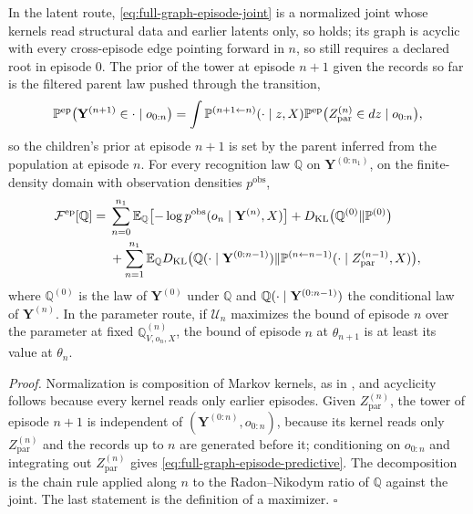 In the latent route, \eqref{eq:full-graph-episode-joint} is a normalized joint whose
kernels read structural data and earlier latents only, so
 holds; its graph is acyclic with every
cross-episode edge pointing forward in $n$, so
 still requires a declared root in episode
$0$. The prior of the tower at episode $n+1$ given the records so far is the filtered
parent law pushed through the transition,
\begin{equation}
\mathbb P^{\mathrm{ep}}\bigl(\mathbf Y^{(n+1)}\in\cdot\mid o_{0:n}\bigr)
=\int\mathbb P^{(n+1\leftarrow n)}(\cdot\mid z,X)
\mathbb P^{\mathrm{ep}}\bigl(Z^{(n)}_{\mathrm{par}}\in dz\mid o_{0:n}\bigr),
\label{eq:full-graph-episode-predictive}
\end{equation}
so the children's prior at episode $n+1$ is set by the parent inferred from the
population at episode $n$. For every recognition law $\mathbb Q$ on $\mathbf
Y^{(0:n_1)}$, on the finite-density domain with observation densities
$p^{\mathrm{obs}}$,
\begin{equation}
\begin{aligned}
\mathcal F^{\mathrm{ep}}[\mathbb Q]
={}&\sum_{n=0}^{n_1}\mathbb E_{\mathbb Q}\bigl[-\log p^{\mathrm{obs}}(o_n\mid\mathbf Y^{(n)},X)\bigr]
+D_{\mathrm{KL}}\bigl(\mathbb Q^{(0)}\Vert\mathbb P^{(0)}\bigr)\\
&+\sum_{n=1}^{n_1}\mathbb E_{\mathbb Q}D_{\mathrm{KL}}\bigl(\mathbb Q(\cdot\mid\mathbf Y^{(0:n-1)})\Vert
\mathbb P^{(n\leftarrow n-1)}(\cdot\mid Z^{(n-1)}_{\mathrm{par}},X)\bigr),
\end{aligned}
\label{eq:full-graph-episode-decomposition}
\end{equation}
where $\mathbb Q^{(0)}$ is the law of $\mathbf Y^{(0)}$ under $\mathbb Q$ and
$\mathbb Q(\cdot\mid\mathbf Y^{(0:n-1)})$ the conditional law of $\mathbf Y^{(n)}$.
In the parameter route, if $\mathcal U_n$ maximizes the bound of episode $n$ over the
parameter at fixed $\mathbb Q^{(n)}_{V,o_n,X}$, the bound of episode $n$ at
$\theta_{n+1}$ is at least its value at $\theta_n$. 

\noindent\emph{Proof.}
Normalization is composition of Markov kernels, as in
, and acyclicity follows because every kernel reads
only earlier episodes. Given $Z^{(n)}_{\mathrm{par}}$, the tower of episode $n+1$ is
independent of $(\mathbf Y^{(0:n)},o_{0:n})$, because its kernel reads only
$Z^{(n)}_{\mathrm{par}}$ and the records up to $n$ are generated before it; conditioning
on $o_{0:n}$ and integrating out $Z^{(n)}_{\mathrm{par}}$ gives
\eqref{eq:full-graph-episode-predictive}. The decomposition is the chain rule
 applied along $n$ to the Radon--Nikodym ratio of
$\mathbb Q$ against the joint. The last statement is the definition of a maximizer.
$\square$

